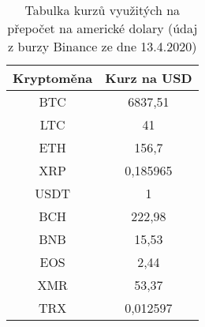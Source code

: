 \begin{table}\centering
\caption{Tabulka kurzů využitých na přepočet na americké dolary (údaj z burzy Binance ze dne 13.4.2020)}
\label{table_rates}
\begin{tabular}{|| c | c ||}
\hline Kryptoměna & Kurz na USD \\ 
\hline\hline BTC & 6837,51 \\ 
\hline LTC & 41 \\ 
\hline ETH & 156,7 \\ 
\hline XRP & 0,185965 \\ 
\hline USDT & 1 \\ 
\hline BCH & 222,98 \\ 
\hline BNB & 15,53 \\ 
\hline EOS & 2,44 \\ 
\hline XMR & 53,37 \\ 
\hline TRX & 0,012597 \\ 
\hline
\end{tabular}
\end{table}